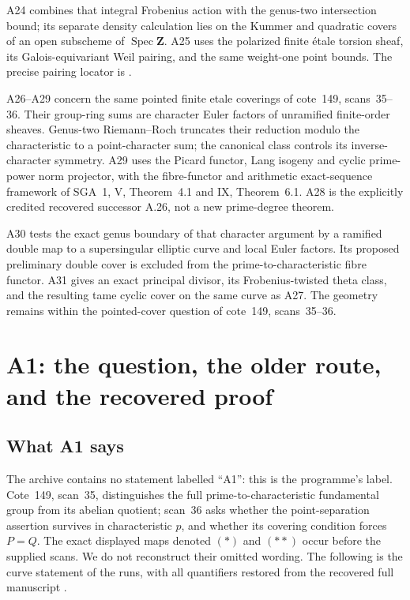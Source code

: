 \documentclass[11pt,a4paper]{article}
\begin{document}
A24 combines that integral Frobenius action with the genus-two
intersection bound; its separate density calculation lies on the
Kummer and quadratic covers of an open subscheme of
$\operatorname{Spec}\mathbf Z$. A25 uses the polarized finite
\'etale torsion sheaf, its Galois-equivariant Weil pairing, and
the same weight-one point bounds. The precise pairing locator is
\cite[\S16 and Lemma~16.2(e)]{MilneAV}.

A26--A29 concern the same pointed finite etale coverings of cote~149,
scans~35--36. Their group-ring sums are character Euler factors of
unramified finite-order sheaves. Genus-two Riemann--Roch truncates their
reduction modulo the characteristic to a point-character sum; the
canonical class controls its inverse-character symmetry. A29 uses
the Picard functor, Lang isogeny and cyclic prime-power norm projector,
with the fibre-functor and arithmetic exact-sequence framework of
SGA~1, V, Theorem~4.1 and IX, Theorem~6.1. A28 is the explicitly
credited recovered successor A.26, not a new prime-degree theorem.

A30 tests the exact genus boundary of that character argument by a
ramified double map to a supersingular elliptic curve and local Euler
factors. Its proposed preliminary double cover is excluded from the
prime-to-characteristic fibre functor. A31 gives an exact principal
divisor, its Frobenius-twisted theta class, and the resulting tame cyclic
cover on the same curve as A27. The geometry remains within the
pointed-cover question of cote~149, scans~35--36.


\section{A1: the question, the older route, and the recovered proof}
\label{sec:a1}

\subsection{What A1 says}
The archive contains no statement labelled ``A1'': this is the programme's
label. Cote~149, scan~35, distinguishes the full prime-to-characteristic
fundamental group from its abelian quotient; scan~36 asks whether the
point-separation assertion survives in characteristic $p$, and whether its
covering condition forces $P=Q$. The exact displayed maps denoted $(*)$ and
$(**)$ occur before the supplied scans. We do not reconstruct their omitted
wording. The following is the curve statement of the runs, with all
quantifiers restored from the recovered full manuscript
\cite[A.1, A.31--A.33]{A1run}.
\end{document}
